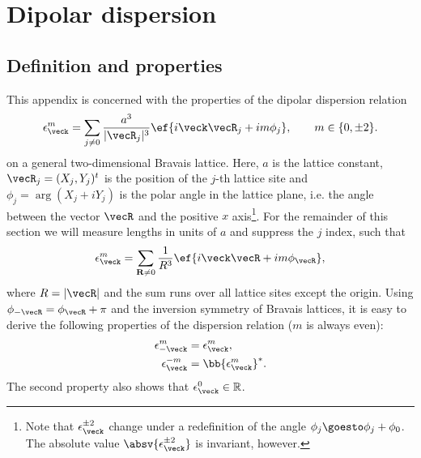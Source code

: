 \chapter{Dipolar dispersion}
\label{dipolar_dispersion}

\newcommand{\eps}{\epsilon}
\newcommand{\epsk}{\epsilon_{\veck}}
\newcommand{\epskm}{\epsilon_{\veck}^m}

\section{Definition and properties}
This appendix is concerned with the properties of the dipolar dispersion relation~\cite{Peter2012b,Syzranov2014,Peter2014}
\begin{align}
    \epskm = \sum_{j\ne 0} \frac{a^3}{|\vecR_j|^3}\ef{i\veck \vecR_j + i m \phi_{j}},\qquad m \in \{0, \pm 2\}.
\end{align}
on a general two-dimensional Bravais lattice.
Here, $a$ is the lattice constant, $\vecR_j=(X_j, Y_j)^t$ is the position of the $j$-th lattice site and $\phi_j = \arg(X_j+i Y_j)$ is the polar angle in the lattice plane, i.e. the angle between the vector $\vecR$ and the positive $x$ axis\footnote{Note that $\epsk^{\pm 2}$ change under a redefinition of the angle $\phi_j \goesto \phi_j + \phi_0$. The absolute value $\absv{\epsk^{\pm 2}}$ is invariant, however.}. For the remainder of this section we will measure lengths in units of $a$ and suppress the $j$ index, such that
\begin{align}
    \epskm = \sum_{\vec{R}\ne0} \frac{1}{R^3}\ef{i\veck \vecR + i m \phi_{\vecR}},
\end{align}
where $R=|\vecR|$ and the sum runs over all lattice sites except the origin.
Using $\phi_{-\vecR} = \phi_\vecR + \pi$ and the inversion symmetry of Bravais lattices,
it is easy to derive the following properties of the dispersion relation ($m$ is always even):
\begin{align}
    \eps_{-\veck}^m &= \epsk^m, \\
    \eps_{\veck}^{-m} &= \bb{ \epsk^m }^*.
\end{align}
The second property also shows that $\epsk^0 \in \mathbb{R}$.

